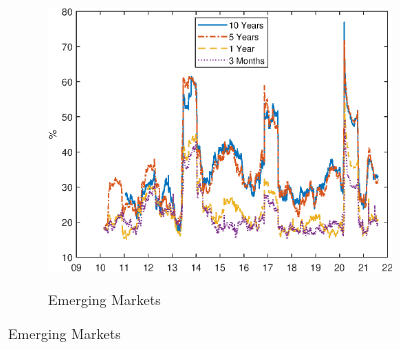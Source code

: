 \documentclass[a4paper, 12pt]{article}
\begin{document}
\begin{appendices}
	\begin{figure}[tbph]
		\caption{Comovement of Yield Curves: Connectedness Index} \label{fig:dy_index_ts}
		\begin{center}
			\begin{minipage}{0.9\linewidth}
				\begin{center}
					\begin{subfigure}[t]{\linewidth}
						\includegraphics[trim={0cm 0cm 0cm 0cm},clip,height=0.38\textheight,width=\linewidth]{../Figures/dy_index_dn_data.eps} \\
						\vspace{-0.37cm}
						\caption{Emerging Markets} \label{subfig:dy_index_tsEM}
					\end{subfigure}
					

\end{center}
\end{minipage}
\end{center}
\end{figure}
\end{appendices}
\end{document}
